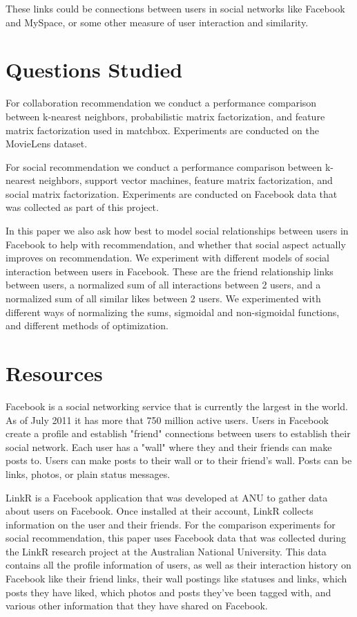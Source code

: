These links could be connections between users in social networks like Facebook and MySpace, or some other measure of user interaction and similarity.

\section{Questions Studied}

For collaboration recommendation we conduct a performance comparison between k-nearest neighbors, probabilistic matrix factorization, and feature matrix factorization used in matchbox. Experiments are conducted on the MovieLens dataset.

For social recommendation we conduct a performance comparison between k-nearest neighbors, support vector machines, feature matrix factorization, and social matrix factorization. Experiments are conducted on Facebook data that was collected as part of this project.

In this paper we also ask how best to model social relationships between users in Facebook to help with recommendation, and whether that social aspect actually improves on recommendation. We experiment with different models of social interaction between users in Facebook. These are the friend relationship links between users, a normalized sum of all interactions between 2 users, and a normalized sum of all similar likes between 2 users. We experimented with different ways of normalizing the sums, sigmoidal and non-sigmoidal functions, and different methods of optimization.

\section{Resources}

Facebook is a social networking service that is currently the largest in the world. As of July 2011 it has more that 750 million active users. Users in Facebook create a profile and establish "friend" connections between users to establish their social network. Each user has a "wall" where they and their friends can make posts to. Users can make posts to their wall or to their friend's wall. Posts can be links, photos, or plain status messages.

LinkR is a Facebook application that was developed at ANU to gather data about users on Facebook. Once installed at their account, LinkR collects information on the user and their friends. For the comparison experiments for social recommendation, this paper uses Facebook data that was collected during the LinkR research project at the Australian National University. This data contains all the profile information of users, as well as their interaction history on Facebook like their friend links, their wall postings like statuses and links, which posts they have liked, which photos and posts they've been tagged with, and various other information that they have shared on Facebook.


